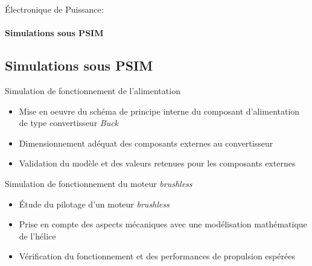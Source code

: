 \documentclass{beamer}
\begin{document}
	\begin{frame}{Électronique de Puissance:}
		\framesubtitle{ Simulations sous PSIM}
		\subsection[Simulations]{Simulations sous PSIM}
		Simulation de fonctionnement de l'alimentation
		\begin{itemize}
			\item Mise en oeuvre du schéma de principe interne du composant d'alimentation de type convertisseur \textit{Buck}
			\item Dimensionnement adéquat des composants externes au convertisseur
			\item Validation du modèle et des valeurs retenues pour les composants externes
		\end{itemize}
	\end{frame}	
	
	\begin{frame}
		Simulation de fonctionnement du moteur \textit{brushless}
		\begin{itemize}
			\item Étude du pilotage d'un moteur \textit{brushless}
			\item Prise en compte des aspects mécaniques avec une modélisation mathématique de l'hélice
			\item Vérification du fonctionnement et des performances de propulsion espérées
		\end{itemize}
	\end{frame}	
	
\end{document}
